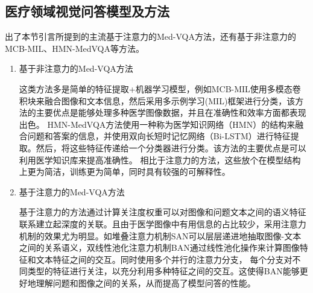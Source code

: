 \subsection{医疗领域视觉问答模型及方法}
出了本节引言所提到的主流基于注意力的Med-VQA方法，还有基于非注意力的MCB-MIL、HMN-MedVQA等方法。
\begin{enumerate}[topsep = 0 pt, itemsep= 0 pt, parsep=0pt, partopsep=0pt, leftmargin=44pt, itemindent=0pt, labelsep=6pt, label=(\arabic*)]
    \item 基于非注意力的Med-VQA方法

    这类方法多是简单的特征提取+机器学习模型，例如MCB-MIL使用多模态卷积块来融合图像和文本信息，然后采用多示例学习(MIL)\cite{maron1997framework}框架进行分类，该方法的主要优点是能够处理多种医学图像数据，并且在准确性和效率方面都表现出色。
    HMN-MedVQA方法使用一种称为医学知识网络（HMN）的结构来融合问题和答案的信息，并使用双向长短时记忆网络（Bi-LSTM）进行特征提取。然后，将这些特征传递给一个分类器进行分类。该方法的主要优点是可以利用医学知识库来提高准确性。
    相比于注意力的方法，这些放个在模型结构上更为简洁，训练更为简单，同时具有较强的可解释性。
    \item 基于注意力的Med-VQA方法
    
    基于注意力的方法通过计算关注度权重可以对图像和问题文本之间的语义特征联系建立起深度的关联。且由于医学图像中有用信息的占比较少，采用注意力机制的效果尤为明显。如堆叠注意力机制SAN可以层层递进地抽取图像-文本之间的关系语义，双线性池化注意力机制BAN通过线性池化操作来计算图像特征和文本特征之间的交互\cite{kim2018bilinear}。同时使用多个并行的注意力分支，
    每个分支对不同类型的特征进行关注，以充分利用多种特征之间的交互。这使得BAN能够更好地理解问题和图像之间的关系，从而提高了模型问答的性能。
\end{enumerate}
